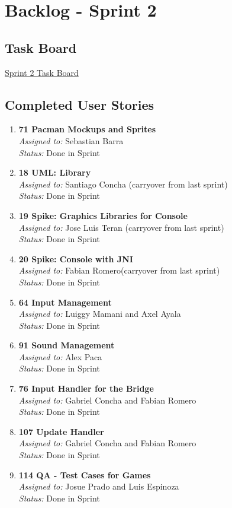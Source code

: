 \section{Backlog - Sprint 2}

\subsection*{Task Board}
\href{https://tree.taiga.io/project/joseluis-teran-coffeetime/taskboard/sprint-2-12274}{Sprint 2 Task Board}

\subsection*{Completed User Stories}

\begin{enumerate}
    \item \textbf{71 Pacman Mockups and Sprites} \\
    \textit{Assigned to:} Sebastian Barra \\
    \textit{Status:} Done in Sprint
    \item \textbf{18 UML: Library} \\
    \textit{Assigned to:} Santiago Concha (carryover from last sprint) \\
    \textit{Status:} Done in Sprint
    \item \textbf{19 Spike: Graphics Libraries for Console} \\
    \textit{Assigned to:} Jose Luis Teran (carryover from last sprint)\\
    \textit{Status:} Done in Sprint
    \item \textbf{20 Spike: Console with JNI} \\
    \textit{Assigned to:} Fabian Romero(carryover from last sprint)\\
    \textit{Status:} Done in Sprint
    \item \textbf{64 Input Management} \\
    \textit{Assigned to:} Luiggy Mamani and Axel Ayala \\
    \textit{Status:} Done in Sprint
    \item \textbf{91 Sound Management} \\
    \textit{Assigned to:} Alex Paca \\
    \textit{Status:} Done in Sprint
    \item \textbf{76 Input Handler for the Bridge} \\
    \textit{Assigned to:} Gabriel Concha and Fabian Romero \\
    \textit{Status:} Done in Sprint
    \item \textbf{107 Update Handler} \\
    \textit{Assigned to:} Gabriel Concha and Fabian Romero \\
    \textit{Status:} Done in Sprint
    \item \textbf{114 QA - Test Cases for Games} \\
    \textit{Assigned to:} Josue Prado and Luis Espinoza \\
    \textit{Status:} Done in Sprint
\end{enumerate}

